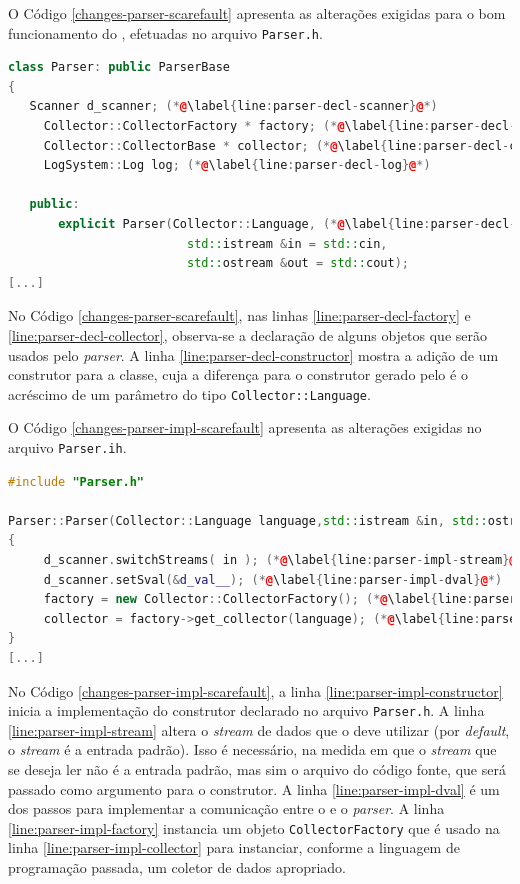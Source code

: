 O Código \ref{changes-parser-scarefault} apresenta as alterações exigidas para
o bom funcionamento do \Scarefault, efetuadas no arquivo \lstinline|Parser.h|. 

\begin{lstlisting}[language=C++, label=changes-parser-scarefault, caption=Alterações no arquivo \lstinline|Parser.h| para uso do scarefault]
class Parser: public ParserBase
{
   Scanner d_scanner; (*@\label{line:parser-decl-scanner}@*)
	 Collector::CollectorFactory * factory; (*@\label{line:parser-decl-factory}@*)
	 Collector::CollectorBase * collector; (*@\label{line:parser-decl-collector}@*)
	 LogSystem::Log log; (*@\label{line:parser-decl-log}@*)
        
   public:
	   explicit Parser(Collector::Language, (*@\label{line:parser-decl-constructor}@*)
		                 std::istream &in = std::cin,
		                 std::ostream &out = std::cout);
[...]
\end{lstlisting}

No Código \ref{changes-parser-scarefault}, nas linhas
\ref{line:parser-decl-factory} e \ref{line:parser-decl-collector}, observa-se
a declaração de alguns objetos que serão usados pelo \textit{parser}. A linha
\ref{line:parser-decl-constructor} mostra a adição de um construtor para a
classe, cuja a diferença para o construtor gerado pelo \bisoncpp é o acréscimo
de um parâmetro do tipo \lstinline|Collector::Language|.

O Código \ref{changes-parser-impl-scarefault} apresenta as alterações exigidas
no arquivo \lstinline|Parser.ih|.

\begin{lstlisting}[language=C++, label=changes-parser-impl-scarefault, caption=Alterações no \lstinline|Parser.ih| para uso do \scarefault]
#include "Parser.h"

Parser::Parser(Collector::Language language,std::istream &in, std::ostream &out) (*@\label{line:parser-impl-constructor}@*)
{
	 d_scanner.switchStreams( in ); (*@\label{line:parser-impl-stream}@*)
	 d_scanner.setSval(&d_val__); (*@\label{line:parser-impl-dval}@*)
	 factory = new Collector::CollectorFactory(); (*@\label{line:parser-impl-factory}@*)
	 collector = factory->get_collector(language); (*@\label{line:parser-impl-collector}@*)
}
[...]
\end{lstlisting}

No Código \ref{changes-parser-impl-scarefault}, a linha \ref{line:parser-impl-constructor}
inicia a implementação do construtor declarado no arquivo \lstinline|Parser.h|.
A linha \ref{line:parser-impl-stream} altera o \textit{stream} de dados que
o \parser deve utilizar (por \textit{default}, o \textit{stream} é a entrada
padrão). Isso é necessário, na medida em que o \textit{stream} que se deseja
ler não é a entrada padrão, mas sim o arquivo do código fonte, que será
passado como argumento para o construtor. A linha
\ref{line:parser-impl-dval} é um dos passos para implementar a comunicação
entre o \scanner e o \textit{parser}. A linha \ref{line:parser-impl-factory}
instancia um objeto \lstinline|CollectorFactory| que é usado na linha
\ref{line:parser-impl-collector} para instanciar, conforme a linguagem de
programação passada, um coletor de dados apropriado.

